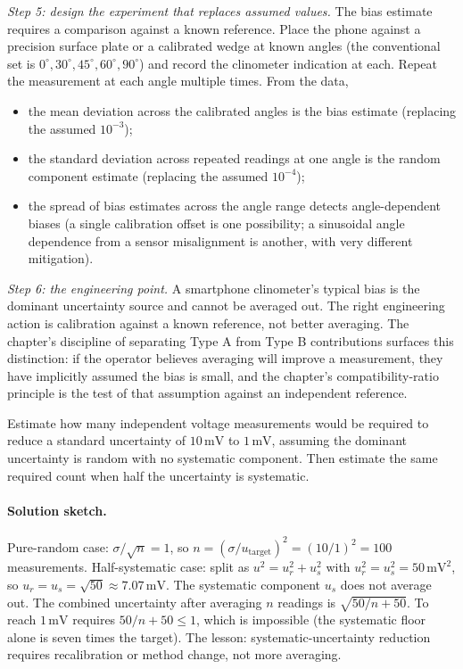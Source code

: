 \emph{Step 5: design the experiment that replaces assumed values.}
The bias estimate requires a comparison against a known reference.
Place the phone against a precision surface plate or a calibrated
wedge at known angles (the conventional set is
$0^{\circ}, 30^{\circ}, 45^{\circ}, 60^{\circ}, 90^{\circ}$) and
record the clinometer indication at each. Repeat the measurement
at each angle multiple times. From the data,
\begin{itemize}[leftmargin=*]
  \item the mean deviation across the calibrated angles is the
    bias estimate (replacing the assumed $10^{-3}$);
  \item the standard deviation across repeated readings at one
    angle is the random component estimate (replacing the assumed
    $10^{-4}$);
  \item the spread of bias estimates across the angle range
    detects angle-dependent biases (a single calibration offset
    is one possibility; a sinusoidal angle dependence from a
    sensor misalignment is another, with very different mitigation).
\end{itemize}

\emph{Step 6: the engineering point.} A smartphone clinometer's
typical bias is the dominant uncertainty source and cannot be
averaged out. The right engineering action is calibration against
a known reference, not better averaging. The chapter's discipline
of separating Type A from Type B contributions surfaces this
distinction: if the operator believes averaging will improve a
measurement, they have implicitly assumed the bias is small, and
the chapter's compatibility-ratio principle is the test of that
assumption against an independent reference.

\begin{exercise}
Estimate how many independent voltage measurements would be required
to reduce a standard uncertainty of $10 \,\si{\milli\volt}$ to
$1 \,\si{\milli\volt}$, assuming the dominant uncertainty is
random with no systematic component. Then estimate the same
required count when half the uncertainty is systematic.
\end{exercise}

\paragraph{Solution sketch.}
Pure-random case: $\sigma/\sqrt{n} = 1$, so
$n = (\sigma/u_{\text{target}})^{2} = (10/1)^{2} = 100$
measurements. Half-systematic case: split as
$u^{2} = u_{r}^{2} + u_{s}^{2}$ with $u_{r}^{2} = u_{s}^{2} =
50 \,\si{\milli\volt\squared}$, so $u_{r} = u_{s} = \sqrt{50}
\approx 7.07 \,\si{\milli\volt}$. The systematic component
$u_{s}$ does not average out. The combined uncertainty after
averaging $n$ readings is $\sqrt{50/n + 50}$. To reach
$1 \,\si{\milli\volt}$ requires $50/n + 50 \leq 1$, which is
impossible (the systematic floor alone is seven times the
target). The lesson: systematic-uncertainty reduction requires
recalibration or method change, not more averaging.

